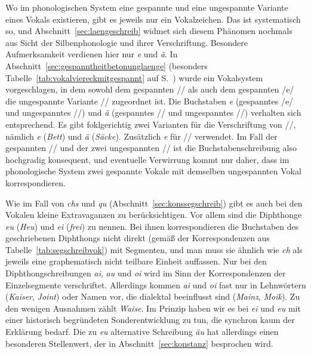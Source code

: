 Wo im phonologischen System eine gespannte und eine ungespannte Variante eines Vokals existieren, gibt es jeweils nur ein Vokalzeichen.
Das ist systematisch so, und Abschnitt~\ref{sec:laengeschreib} widmet sich diesem Phänomen nochmals aus Sicht der Silbenphonologie und ihrer Verschriftung.
Besondere Aufmerksamkeit verdienen hier nur \textit{e} und \textit{ä}.
In Abschnitt~\ref{sec:gespanntheitbetonunglaenge} (besonders Tabelle~\ref{tab:vokalviereckmitgespannt} auf S.~\pageref{tab:vokalviereckmitgespannt}) wurde ein Vokalsystem vorgeschlagen, in dem sowohl dem gespannten // als auch dem gespannten /e/ die ungespannte Variante // zugeordnet ist.
Die Buchstaben \textit{e} (gespanntes /e/ und ungespanntes //) und \textit{ä} (gespanntes // und ungespanntes //) verhalten sich entsprechend.
Es gibt foklgerichtig zwei Varianten für die Verschriftung von //, nämlich \textit{e} (\textit{Bett}) und \textit{ä} (\textit{Säcke}).
Zusätzlich \textit{e} für // verwendet.
Im Fall der gespannten // und der zwei ungespannten // ist die Buchstabenschreibung also hochgradig konsequent, und eventuelle Verwirrung kommt nur daher, dass im phonologische System zwei gespannte Vokale mit demselben ungespannten Vokal korrespondieren.

Wie im Fall von \textit{chs} und \textit{qu} (Abschnitt~\ref{sec:konssegschreib}) gibt es auch bei den Vokalen kleine Extravaganzen zu berücksichtigen.
Vor allem sind die Diphthonge \textit{eu} (\textit{Heu}) und \textit{ei} (\textit{frei}) zu nennen.
Bei ihnen korrespondieren die Buchstaben des geschriebenen Diphthongs nicht direkt (gemäß der Korrespondenzen aus Tabelle~\ref{tab:segschreibvok}) mit Segmenten, und man muss sie ähnlich wie \textit{ch} als jeweils eine graphematisch nicht teilbare Einheit auffassen.
Nur bei den Diphthongschreibungen \textit{ai}, \textit{au} und \textit{oi} wird im Sinn der Korrespondenzen der Einzelsegmente verschriftet.
Allerdings kommen \textit{ai} und \textit{oi} fast nur in Lehnwörtern (\textit{Kaiser}, \textit{Joint}) oder Namen vor, die dialektal beeinflusst sind (\textit{Mainz}, \textit{Moik}).
Zu den wenigen Ausnahmen zählt \textit{Waise}.
Im Prinzip haben wir es bei \textit{ei} und \textit{eu} mit einer historisch begründeten Sonderentwicklung zu tun, die synchron kaum der Erklärung bedarf.
Die zu \textit{eu} alternative Schreibung \textit{äu} hat allerdings einen besonderen Stellenwert, der in Abschnitt~\ref{sec:konstanz} besprochen wird.

